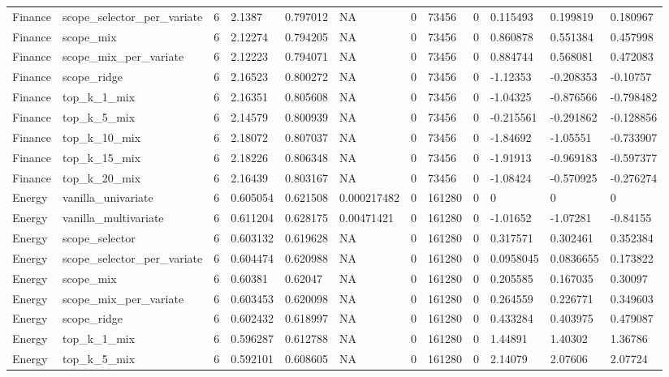 \begin{tabular}{llllllllllll}
Finance & scope\_selector\_per\_variate & 6 & 2.1387 & 0.797012 & NA & 0 & 73456 & 0 & 0.115493 & 0.199819 & 0.180967 \\
Finance & scope\_mix & 6 & 2.12274 & 0.794205 & NA & 0 & 73456 & 0 & 0.860878 & 0.551384 & 0.457998 \\
Finance & scope\_mix\_per\_variate & 6 & 2.12223 & 0.794071 & NA & 0 & 73456 & 0 & 0.884744 & 0.568081 & 0.472083 \\
Finance & scope\_ridge & 6 & 2.16523 & 0.800272 & NA & 0 & 73456 & 0 & -1.12353 & -0.208353 & -0.10757 \\
Finance & top\_k\_1\_mix & 6 & 2.16351 & 0.805608 & NA & 0 & 73456 & 0 & -1.04325 & -0.876566 & -0.798482 \\
Finance & top\_k\_5\_mix & 6 & 2.14579 & 0.800939 & NA & 0 & 73456 & 0 & -0.215561 & -0.291862 & -0.128856 \\
Finance & top\_k\_10\_mix & 6 & 2.18072 & 0.807037 & NA & 0 & 73456 & 0 & -1.84692 & -1.05551 & -0.733907 \\
Finance & top\_k\_15\_mix & 6 & 2.18226 & 0.806348 & NA & 0 & 73456 & 0 & -1.91913 & -0.969183 & -0.597377 \\
Finance & top\_k\_20\_mix & 6 & 2.16439 & 0.803167 & NA & 0 & 73456 & 0 & -1.08424 & -0.570925 & -0.276274 \\
Energy & vanilla\_univariate & 6 & 0.605054 & 0.621508 & 0.000217482 & 0 & 161280 & 0 & 0 & 0 & 0 \\
Energy & vanilla\_multivariate & 6 & 0.611204 & 0.628175 & 0.00471421 & 0 & 161280 & 0 & -1.01652 & -1.07281 & -0.84155 \\
Energy & scope\_selector & 6 & 0.603132 & 0.619628 & NA & 0 & 161280 & 0 & 0.317571 & 0.302461 & 0.352384 \\
Energy & scope\_selector\_per\_variate & 6 & 0.604474 & 0.620988 & NA & 0 & 161280 & 0 & 0.0958045 & 0.0836655 & 0.173822 \\
Energy & scope\_mix & 6 & 0.60381 & 0.62047 & NA & 0 & 161280 & 0 & 0.205585 & 0.167035 & 0.30097 \\
Energy & scope\_mix\_per\_variate & 6 & 0.603453 & 0.620098 & NA & 0 & 161280 & 0 & 0.264559 & 0.226771 & 0.349603 \\
Energy & scope\_ridge & 6 & 0.602432 & 0.618997 & NA & 0 & 161280 & 0 & 0.433284 & 0.403975 & 0.479087 \\
Energy & top\_k\_1\_mix & 6 & 0.596287 & 0.612788 & NA & 0 & 161280 & 0 & 1.44891 & 1.40302 & 1.36786 \\
Energy & top\_k\_5\_mix & 6 & 0.592101 & 0.608605 & NA & 0 & 161280 & 0 & 2.14079 & 2.07606 & 2.07724 \\

\end{tabular}
